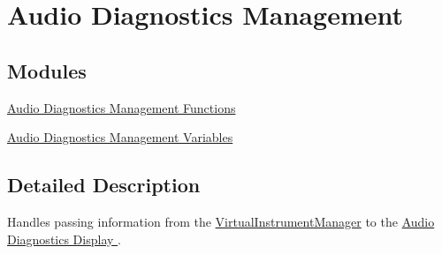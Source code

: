 \hypertarget{group___v_i_m_diag}{}\section{Audio Diagnostics Management}
\label{group___v_i_m_diag}
\subsection*{Modules}
\begin{DoxyCompactItemize}
\item 
\hyperlink{group___v_i_m_diag_func}{Audio Diagnostics Management Functions}
\item 
\hyperlink{group___v_i_m_diag_var}{Audio Diagnostics Management Variables}
\end{DoxyCompactItemize}


\subsection{Detailed Description}
Handles passing information from the \hyperlink{class_virtual_instrument_manager}{Virtual\+Instrument\+Manager} to the \hyperlink{group___audio_testing_class_a_t_i___diagnostics}{Audio Diagnostics Display }. 